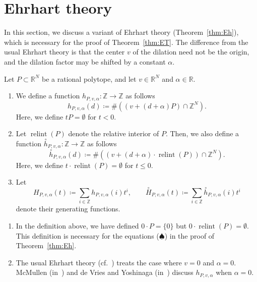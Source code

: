 \documentclass[ALCO,published]{cedram}
\theoremstyle{remark}
\begin{document}
\section{Ehrhart theory}\label{section:ET}
In this section, we discuss a variant of Ehrhart theory (Theorem~\ref{thm:Eh}), which is necessary for the proof of Theorem~\ref{thm:ET}. The difference from the usual Ehrhart theory is that the center $v$ of the dilation need not be the origin, and the dilation factor may be shifted by a constant $\alpha$. 

\begin{defi}
Let $P \subset \mathbb{R}^N$ be a rational polytope, and let $v \in \mathbb{R}^N$ and $\alpha \in \mathbb{R}$. 

\begin{enumerate}
\item
We define a function $h_{P, v, \alpha}: \mathbb{Z} \to \mathbb{Z}$ as follows
\[
h_{P, v, \alpha}(d) \coloneqq  \# \left( (v + (d + \alpha) P) \cap \mathbb{Z}^N \right). 
\]
Here, we define $t P = \emptyset$ for $t < 0$. 

\item
Let $\operatorname{relint}(P)$ denote the relative interior of $P$. 
Then, we also define a function $\overset{\circ}{h} _{P, v, \alpha}: \mathbb{Z} \to \mathbb{Z}$ as follows
\[
\overset{\circ}{h}_{P, v, \alpha}(d) \coloneqq  \# \left( (v + (d + \alpha) \cdot \operatorname{relint}({P})) \cap \mathbb{Z}^N \right). 
\]
Here, we define $t \cdot \operatorname{relint}({P}) = \emptyset$ for $t \le 0$. 

\item
Let  
\[
H_{P, v, \alpha} (t) \coloneqq  \sum _{i \in \mathbb{Z}} h_{P, v, \alpha}(i) t^i, \qquad
\overset{\circ}{H}_{P, v, \alpha} (t) \coloneqq  \sum _{i \in \mathbb{Z}} \overset{\circ}{h}_{P, v, \alpha}(i) t^i
\]
denote their generating functions. 
\end{enumerate}
\end{defi}

\begin{rmk}  \hfill
\begin{enumerate}
\item
In the definition above, we have defined $0 \cdot P = \{ 0 \}$ but $0 \cdot \operatorname{relint}({P}) = \emptyset$. This definition is necessary for the equations ($\spadesuit$) in the proof of Theorem~\ref{thm:Eh}.

\item
The usual Ehrhart theory (cf.~\cite{BR}) treats the case where $v = 0$ and $\alpha = 0$. 
McMullen (in~\cite{McM78}) and de Vries and Yoshinaga (in~\cite[Section 3]{dVY21}) discuss $h_{P, v, \alpha}$ when $\alpha = 0$. 
\end{enumerate}
\end{rmk}
\end{document}
